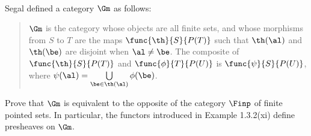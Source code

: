 \documentclass[../../main]{subfiles}
\begin{document}
\paragraph{}
\begin{exercise}
	Segal defined a category \(\Gm\) as follows:
	\begin{quote}
		\(\Gm\) is the category whose objects are all finite sets, and whose
		morphisms from \(S\) to \(T\) are the maps \(\func{\th}{S}{P(T)}\) such
		that \(\th(\al)\) and \(\th(\be)\) are disjoint when \(\al\ne\be\). The
		composite of \(\func{\th}{S}{P(T)}\) and \(\func{\phi}{T}{P(U)}\) is
		\(\func{\psi}{S}{P(U)}\), where
		\(\psi(\al)=\bigcup\limits_{\be\in\th(\al)}\phi(\be)\).
	\end{quote}
	Prove that \(\Gm\) is equivalent to the opposite of the category \(\Finp\)
	of finite pointed sets. In particular, the functors introduced in Example
	1.3.2(xi) define presheaves on \(\Gm\).
\end{exercise}
\end{document}
